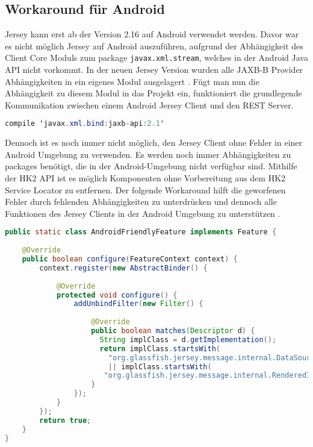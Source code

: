 \subsection{Workaround für Android}
\label{workaroundAndroid}
Jersey kann erst ab der Version 2.16 auf Android verwendet werden. Davor war es nicht möglich Jersey auf Android auszuführen, aufgrund der Abhängigkeit des Client Core Moduls zum package \texttt{javax.xml.stream}, welches in der Android Java API nicht vorkommt. In der neuen Jersey Version wurden alle JAXB-B Provider Abhängigkeiten in ein eigenes Modul ausgelagert \cite{jerseyAndroid:podlesak}. Fügt man nun die Abhängigkeit zu diesem Modul in das Projekt ein, funktioniert die grundlegende Kommunikation zwischen einem Android Jersey Client und den REST Server. 

\begin{lstlisting}[language=java]
compile 'javax.xml.bind:jaxb-api:2.1'
\end{lstlisting}
 
Dennoch ist es noch immer nicht möglich, den Jersey Client ohne Fehler in einer Android Umgebung zu verwenden. Es werden noch immer Abhängigkeiten zu packages benötigt, die in der Android-Umgebung nicht verfügbar sind. Mithilfe der HK2 API ist es möglich Komponenten ohne Vorbereitung aus dem HK2 Service Locator zu entfernen. Der folgende Workaround hilft die geworfenen Fehler durch fehlenden Abhängigkeiten zu unterdrücken und dennoch alle Funktionen des Jersey Clients in der Android Umgebung zu unterstützen \cite{jerseyAndroid2:podlesak}.

\begin{lstlisting}[language=java, caption={Workaround Jersey Client auf Android},label={lst:jerseyAndroid }, escapechar=|, frame=single]
public static class AndroidFriendlyFeature implements Feature {
	
	@Override
	public boolean configure(FeatureContext context) {
		context.register(new AbstractBinder() {
		
			@Override
			protected void configure() {
				addUnbindFilter(new Filter() {
				
					@Override
					public boolean matches(Descriptor d) {
					  String implClass = d.getImplementation();
					  return implClass.startsWith(
						"org.glassfish.jersey.message.internal.DataSource")
						|| implClass.startsWith(
					   "org.glassfish.jersey.message.internal.RenderedImage");
					}
				});
			}
		});
		return true;
	}
}
\end{lstlisting}

